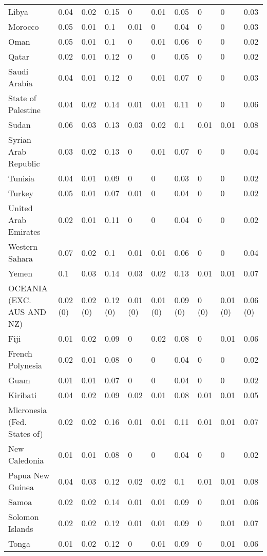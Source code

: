 \begin{longtable}[t]{llllllllll}
Libya & 0.04 & 0.02 & 0.15 & 0 & 0.01 & 0.05 & 0 & 0 & 0.03\\
Morocco & 0.05 & 0.01 & 0.1 & 0.01 & 0 & 0.04 & 0 & 0 & 0.03\\
Oman & 0.05 & 0.01 & 0.1 & 0 & 0.01 & 0.06 & 0 & 0 & 0.02\\
Qatar & 0.02 & 0.01 & 0.12 & 0 & 0 & 0.05 & 0 & 0 & 0.02\\
Saudi Arabia & 0.04 & 0.01 & 0.12 & 0 & 0.01 & 0.07 & 0 & 0 & 0.03\\
State of Palestine & 0.04 & 0.02 & 0.14 & 0.01 & 0.01 & 0.11 & 0 & 0 & 0.06\\
Sudan & 0.06 & 0.03 & 0.13 & 0.03 & 0.02 & 0.1 & 0.01 & 0.01 & 0.08\\
Syrian Arab Republic & 0.03 & 0.02 & 0.13 & 0 & 0.01 & 0.07 & 0 & 0 & 0.04\\
Tunisia & 0.04 & 0.01 & 0.09 & 0 & 0 & 0.03 & 0 & 0 & 0.02\\
Turkey & 0.05 & 0.01 & 0.07 & 0.01 & 0 & 0.04 & 0 & 0 & 0.02\\
United Arab Emirates & 0.02 & 0.01 & 0.11 & 0 & 0 & 0.04 & 0 & 0 & 0.02\\
Western Sahara & 0.07 & 0.02 & 0.1 & 0.01 & 0.01 & 0.06 & 0 & 0 & 0.04\\
Yemen & 0.1 & 0.03 & 0.14 & 0.03 & 0.02 & 0.13 & 0.01 & 0.01 & 0.07\\
OCEANIA (EXC. AUS AND NZ) & 0.02 (0) & 0.02 (0) & 0.12 (0) & 0.01 (0) & 0.01 (0) & 0.09 (0) & 0 (0) & 0.01 (0) & 0.06 (0)\\
Fiji & 0.01 & 0.02 & 0.09 & 0 & 0.02 & 0.08 & 0 & 0.01 & 0.06\\
French Polynesia & 0.02 & 0.01 & 0.08 & 0 & 0 & 0.04 & 0 & 0 & 0.02\\
Guam & 0.01 & 0.01 & 0.07 & 0 & 0 & 0.04 & 0 & 0 & 0.02\\
Kiribati & 0.04 & 0.02 & 0.09 & 0.02 & 0.01 & 0.08 & 0.01 & 0.01 & 0.05\\
Micronesia (Fed. States of) & 0.02 & 0.02 & 0.16 & 0.01 & 0.01 & 0.11 & 0.01 & 0.01 & 0.07\\
New Caledonia & 0.01 & 0.01 & 0.08 & 0 & 0 & 0.04 & 0 & 0 & 0.02\\
Papua New Guinea & 0.04 & 0.03 & 0.12 & 0.02 & 0.02 & 0.1 & 0.01 & 0.01 & 0.08\\
Samoa & 0.02 & 0.02 & 0.14 & 0.01 & 0.01 & 0.09 & 0 & 0.01 & 0.06\\
Solomon Islands & 0.02 & 0.02 & 0.12 & 0.01 & 0.01 & 0.09 & 0 & 0.01 & 0.07\\
Tonga & 0.01 & 0.02 & 0.12 & 0 & 0.01 & 0.09 & 0 & 0.01 & 0.06\\

\end{longtable}
